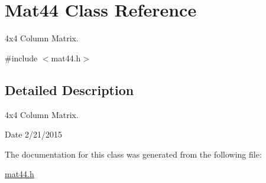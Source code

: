\hypertarget{class_mat44}{}\section{Mat44 Class Reference}
\label{class_mat44}


4x4 Column Matrix.  




{\ttfamily \#include $<$mat44.\+h$>$}



\subsection{Detailed Description}
4x4 Column Matrix. 

\begin{DoxyDate}{Date}
2/21/2015 
\end{DoxyDate}


The documentation for this class was generated from the following file\+:\begin{DoxyCompactItemize}
\item 
\hyperlink{mat44_8h}{mat44.\+h}\end{DoxyCompactItemize}
